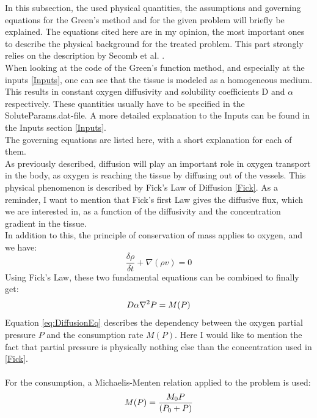In this subsection, the used physical quantities, the assumptions and governing equations for the Green's method and for the given problem will briefly be explained. The equations cited here are in my opinion, the most important ones to describe the physical background for the treated problem. This part strongly relies on the description by Secomb et al. \cite{Secomb2004}.
\\When looking at the code of the Green's function method, and especially at the inputs \ref{Inputs}, one can see that the tissue is modeled as a homogeneous medium. This results in constant oxygen diffusivity and solubility coefficients D and $\alpha$ respectively. These quantities usually have to be specified in the SoluteParams.dat-file. A more detailed explanation to the Inputs can be found in the Inputs section \ref{Inputs}.
\\The governing equations are listed here, with a short explanation for each of them.
\\As previously described, diffusion will play an important role in oxygen transport in the body, as oxygen is reaching the tissue by diffusing out of the vessels. This physical phenomenon is described by Fick's Law of Diffusion \ref{Fick}.
%
As a reminder, I want to mention that Fick's first Law gives the diffusive flux, which we are interested in, as a function of the diffusivity and the concentration gradient in the tissue.
\\In addition to this, the principle of conservation of mass applies to oxygen, and we have:
\begin{equation}
\frac{\delta \rho} {\delta t} + \nabla (\rho v) = 0
\end{equation}
%
Using Fick's Law, these two fundamental equations can be combined to finally get:
\begin{equation}
\\D\alpha\nabla^2P = M(P)
\label{eq:DiffusionEq}
\end{equation}
%
Equation \ref{eq:DiffusionEq} describes the dependency between the oxygen partial pressure $P$ and the consumption rate $M(P)$. Here I would like to mention the fact that partial pressure is physically nothing else than the concentration used in \ref{Fick}.\\
\\For the consumption, a Michaelis-Menten relation applied to the problem is used:
\begin{equation}
\\M(P) = \frac{M_0P}{(P_0 + P)}
\label{eq:MichaelisMenten}
\end{equation}
